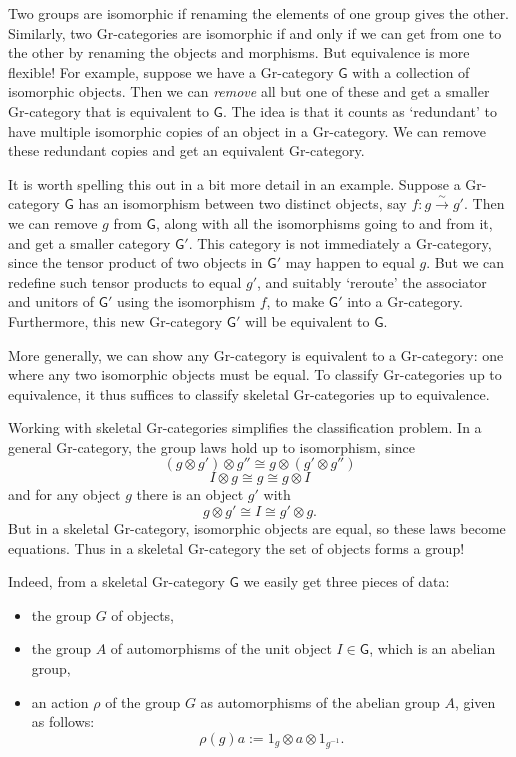 \documentclass[reqno,12pt]{amsart}
\newcommand{\maps}{\colon}    %
\newcommand{\G}{{\mathsf{G}}}   %
\newcommand{\define}[1]{\textbf{\boldmath{#1}}}
\theoremstyle{definition}
\begin{document}
Two groups are isomorphic if renaming the elements of one group gives the other.  Similarly, two Gr-categories are isomorphic if and only if we can get from one to the other by renaming the objects and morphisms.  But equivalence is more flexible!   For example, suppose we have a Gr-category $\G$ with a collection of isomorphic objects.  Then we can \emph{remove} all but one of these and get a smaller Gr-category that is equivalent to $\G$.  The idea is that it counts as `redundant' to have multiple isomorphic copies of an object in a Gr-category.  We can remove these redundant copies and get an equivalent Gr-category.

It is worth spelling this out in a bit more detail in an example.  Suppose a Gr-category $\G$ has an isomorphism between two distinct objects, say $f \maps g \xrightarrow{\, \sim \, } g'$.  Then we can remove $g$ from $\G$, along with all the isomorphisms going to and from it, and get a smaller category $\G'$.  This category is not immediately a Gr-category, since the tensor product of two objects in $\G'$ may happen to equal $g$.  But we can redefine such tensor products to equal $g'$, and suitably `reroute' the associator and unitors of $\G'$ using the isomorphism $f$, to make $\G'$ into a Gr-category.   Furthermore, this new Gr-category $\G'$ will be equivalent to $\G$.

More generally, we can show any Gr-category is equivalent to a \define{skeletal} Gr-category: one where any two isomorphic objects must be equal.   To classify Gr-categories up to equivalence, it thus suffices to classify skeletal Gr-categories up to equivalence.

Working with skeletal Gr-categories simplifies the classification problem.   In a general Gr-category, the group laws hold up to isomorphism, since
\[    (g \otimes g') \otimes g'' \cong g \otimes (g' \otimes g'') \]
\[      I \otimes g \cong g \cong g \otimes I  \]
and for any object $g$ there is an object $g'$ with
\[      g \otimes g' \cong I \cong g' \otimes g. \]
But in a skeletal Gr-category, isomorphic objects are equal, so these laws become equations.  Thus in a skeletal Gr-category the set of objects forms a group!  

Indeed, from a skeletal Gr-category $\G$ we easily get three pieces of data:
\begin{itemize}
\item the group $G$ of objects,
\item the group $A$ of automorphisms of the unit object $I \in \G$, which is an abelian group,
\item an action $\rho$ of the group $G$ as automorphisms of the abelian 
group $A$, given as follows:
\[     \rho(g)a := 1_g \otimes a \otimes 1_{g^{-1}} .\]
\end{itemize}
\end{document}
